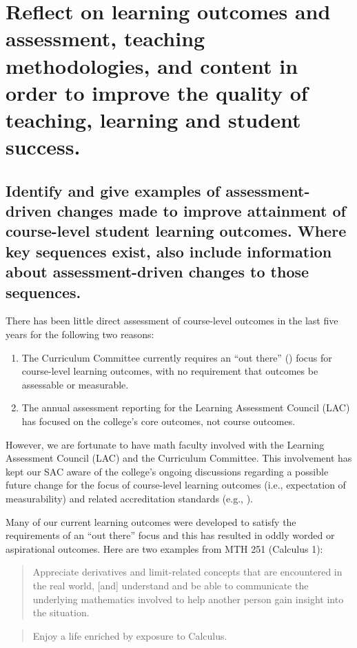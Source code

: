 \chapter[Outcomes and Assessment]{Reflect on learning outcomes and assessment, teaching methodologies, and content in order to improve the quality of teaching, learning and student success.}

\section[Course-Level Outcomes]{Identify and give examples of assessment-driven changes made to improve attainment of course-level student learning outcomes.   Where key sequences exist, also include information about assessment-driven changes to those sequences.}

There has been little direct assessment of course-level outcomes in the last five years for the following two reasons: 
\begin{enumerate}
\item The Curriculum Committee currently requires an ``out there'' (\cite{courseoutcomes}) focus for course-level learning outcomes, with no requirement that outcomes be assessable or measurable.  
\item The annual assessment reporting for the Learning Assessment Council (LAC) has focused on the college's core outcomes, not course outcomes.  
\end{enumerate}


However, we are fortunate to have math faculty involved with the Learning Assessment Council (LAC) and the Curriculum Committee. This involvement has kept our SAC aware of the college's ongoing discussions regarding a possible future change for the focus of course-level learning outcomes  (i.e., expectation of measurability) and related accreditation standards (e.g., \cite[Standard 4.A.3]{NWCCU}).

Many of our current learning outcomes were developed to satisfy the requirements of an ``out there'' focus and this has resulted in oddly worded or aspirational outcomes.  Here are two examples from MTH 251 (Calculus 1):

\begin{quote}
Appreciate derivatives and limit-related concepts that are encountered in the real world, [and] understand and be able to communicate the underlying mathematics involved to help another person gain insight into the situation.
\end{quote}
\begin{quote}
Enjoy a life enriched by exposure to Calculus.
\end{quote}

